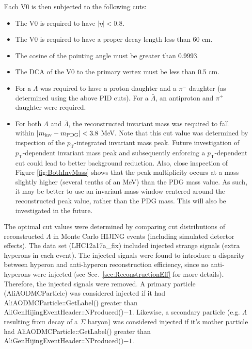 Each V0 is then subjected to the following cuts:
\begin{itemize}
\item The V0 is required to have $|\eta| < 0.8$.
\item The V0 is required to have a proper decay length less than 60 cm.
\item The cosine of the pointing angle must be greater than 0.9993.
\item The DCA of the V0 to the primary vertex must be less than 0.5 cm.
\item For a $\Lambda$ was required to have a proton daughter and a $\pi^-$ daughter (as determined using the above PID cuts).  For a $\bar{\Lambda}$, an antiproton and $\pi^+$ daughter were required.
\item For both $\Lambda$ and $\bar{\Lambda}$, the reconstructed invariant mass was required to fall within $\left\lvert m_\mathrm{inv}-m_\mathrm{PDG}\right\rvert < 3.8$ MeV.  Note that this cut value was determined by inspection of the $p_\mathrm{T}$-integrated invariant mass peak.  Future investigation of $p_\mathrm{T}$-dependent invariant mass peak and subsequently enforcing a $p_\mathrm{T}$-dependent cut could lead to better background reduction.  Also, close inspection of Figure \ref{fig:BothInvMass} shows that the peak multiplicity occurs at a mass slightly higher (several tenths of an MeV) than the PDG mass value.  As such, it may be better to use an invariant mass window centered around the reconstructed peak value, rather than the PDG mass.  This will also be investigated in the future.
\end{itemize}

The optimal cut values were determined by comparing cut distributions of reconstructed $\Lambda$ in Monte Carlo HIJING events (including simulated detector effects).  The data set (LHC12a17a\_fix) included injected strange signals (extra hyperons in each event).  The injected signals were found to introduce a disparity between hyperon and anti-hyperon reconstruction efficiency, since no anti-hyperons were injected (see Sec.\ \ref{sec:ReconstructionEff} for more details).  Therefore, the injected signals were removed.  A primary particle (AliAODMCParticle) was considered injected if it had AliAODMCParticle::GetLabel() greater than AliGenHijingEventHeader::NProduced()$-1$. Likewise, a secondary particle (e.g. $\Lambda$ resulting from decay of a $\Sigma$ baryon) was considered injected if it's mother particle had AliAODMCParticle::GetLabel() greater than AliGenHijingEventHeader::NProduced()$-1$.

